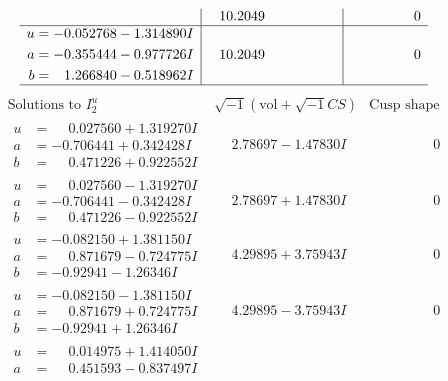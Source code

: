 \documentclass[1p]{elsarticle_modified}
\theoremstyle{definition}
\newcommand{\I}{\sqrt{-1}}
\begin{document}
$$\begin{array}{c|c|c}
 & \phantom{-}10.2049\phantom{ +0.000000I} & \phantom{-0.000000 } 0 \\ \hline\begin{aligned}
u &= -0.052768 - 1.314890 I \\
a &= -0.355444 - 0.977726 I \\
b &= \phantom{-}1.266840 - 0.518962 I\end{aligned}
 & \phantom{-}10.2049\phantom{ +0.000000I} & \phantom{-0.000000 } 0\\
 \hline 
 \end{array}$$\newpage$$\begin{array}{c|c|c}  
\text{Solutions to }I^u_{2}& \I (\text{vol} + \sqrt{-1}CS) & \text{Cusp shape}\\
 \hline 
\begin{aligned}
u &= \phantom{-}0.027560 + 1.319270 I \\
a &= -0.706441 + 0.342428 I \\
b &= \phantom{-}0.471226 + 0.922552 I\end{aligned}
 & \phantom{-}2.78697 - 1.47830 I & \phantom{-0.000000 } 0 \\ \hline\begin{aligned}
u &= \phantom{-}0.027560 - 1.319270 I \\
a &= -0.706441 - 0.342428 I \\
b &= \phantom{-}0.471226 - 0.922552 I\end{aligned}
 & \phantom{-}2.78697 + 1.47830 I & \phantom{-0.000000 } 0 \\ \hline\begin{aligned}
u &= -0.082150 + 1.381150 I \\
a &= \phantom{-}0.871679 - 0.724775 I \\
b &= -0.92941 - 1.26346 I\end{aligned}
 & \phantom{-}4.29895 + 3.75943 I & \phantom{-0.000000 } 0 \\ \hline\begin{aligned}
u &= -0.082150 - 1.381150 I \\
a &= \phantom{-}0.871679 + 0.724775 I \\
b &= -0.92941 + 1.26346 I\end{aligned}
 & \phantom{-}4.29895 - 3.75943 I & \phantom{-0.000000 } 0 \\ \hline\begin{aligned}
u &= \phantom{-}0.014975 + 1.414050 I \\
a &= \phantom{-}0.451593 - 0.837497 I \\

\end{aligned}
\end{array}$$
\end{document}
